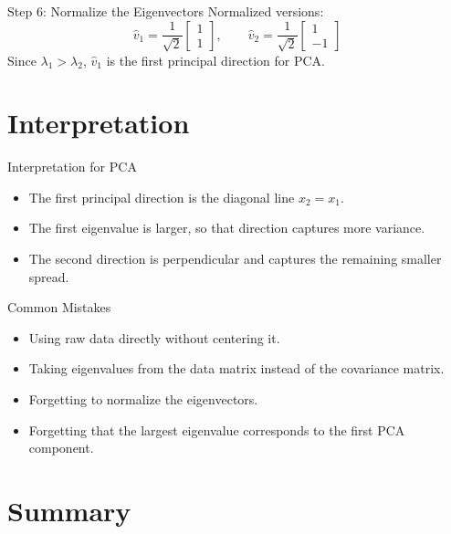 \documentclass[aspectratio=169]{beamer}
\begin{document}
\begin{frame}{Step 6: Normalize the Eigenvectors}
  Normalized versions:
  \[
    \hat v_1 =
    \frac{1}{\sqrt{2}}
    \begin{bmatrix}
      1\\1
    \end{bmatrix},
    \qquad
    \hat v_2 =
    \frac{1}{\sqrt{2}}
    \begin{bmatrix}
      1\\-1
    \end{bmatrix}
  \]
  \vspace{0.3em}
  Since $\lambda_1 > \lambda_2$, $\hat v_1$ is the first principal direction for PCA.
\end{frame}

\section{Interpretation}

\begin{frame}{Interpretation for PCA}
  \begin{itemize}[<+->]
    \item The first principal direction is the diagonal line $x_2 = x_1$.
    \item The first eigenvalue is larger, so that direction captures more variance.
    \item The second direction is perpendicular and captures the remaining smaller spread.
  \end{itemize}
\end{frame}

\begin{frame}{Common Mistakes}
  \begin{itemize}[<+->]
    \item Using raw data directly without centering it.
    \item Taking eigenvalues from the data matrix instead of the covariance matrix.
    \item Forgetting to normalize the eigenvectors.
    \item Forgetting that the largest eigenvalue corresponds to the first PCA component.
  \end{itemize}
\end{frame}

\section{Summary}
\end{document}
